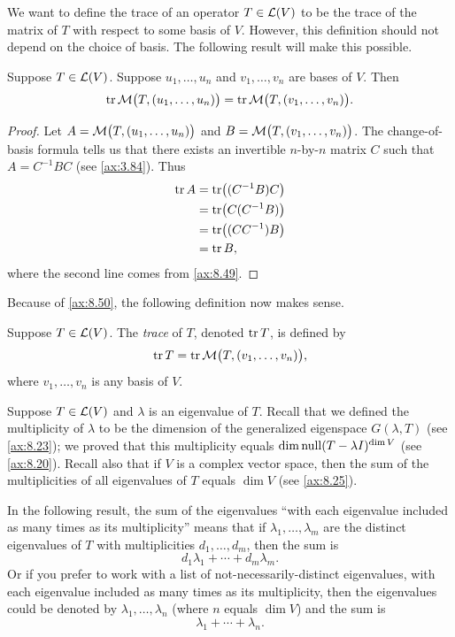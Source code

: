 We want to define the trace of an operator $T\in\mathcal{L}(V)$ to be the trace of the
matrix of $T$ with respect to some basis of $V$. However, this definition should
not depend on the choice of basis. The following result will make this
possible.

\begin{result}\label{ax:8.50}
Suppose $T\in\mathcal{L}(V)$. Suppose $u_1,\dots,u_n$ and $v_1,\dots,v_n$ are bases
of $V$. Then
\[ \operatorname{tr}\mathcal{M}\bigl(T,(u_1,\dots,u_n)\bigr) = \operatorname{tr}\mathcal{M}\bigl(T,(v_1,\dots,v_n)\bigr). \]
\end{result}

\begin{proof}
Let $A=\mathcal{M}\bigl(T,(u_1,\dots,u_n)\bigr)$ and
$B=\mathcal{M}\bigl(T,(v_1,\dots,v_n)\bigr)$. The change-of-basis formula tells us
that there exists an invertible $n$-by-$n$ matrix $C$ such that $A=C^{-1}BC$
(see \ref{ax:3.84}). Thus
\begin{align*}
\operatorname{tr} A &= \operatorname{tr}\bigl((C^{-1}B)C\bigr)\\
&= \operatorname{tr}\bigl(C(C^{-1}B)\bigr)\\
&= \operatorname{tr}\bigl((CC^{-1})B\bigr)\\
&= \operatorname{tr} B,
\end{align*}
where the second line comes from \ref{ax:8.49}.
\end{proof}

Because of \ref{ax:8.50}, the following definition now makes sense.

\begin{definition}\label{ax:8.51}
Suppose $T\in\mathcal{L}(V)$. The \emph{trace} of $T$, denoted $\operatorname{tr} T$, is defined by
\[ \operatorname{tr} T = \operatorname{tr}\mathcal{M}\bigl(T,(v_1,\dots,v_n)\bigr), \]
where $v_1,\dots,v_n$ is any basis of $V$.
\end{definition}

Suppose $T\in\mathcal{L}(V)$ and $\lambda$ is an eigenvalue of $T$. Recall that we
defined the multiplicity of $\lambda$ to be the dimension of the generalized
eigenspace $G(\lambda,T)$ (see \ref{ax:8.23}); we proved that this multiplicity
equals $\operatorname{dim}\operatorname{null}(T-\lambda I)^{\operatorname{dim} V}$ (see \ref{ax:8.20}). Recall also that
if $V$ is a complex vector space, then the sum of the multiplicities of all
eigenvalues of $T$ equals $\dim V$ (see \ref{ax:8.25}).

In the following result, the sum of the eigenvalues ``with each eigenvalue
included as many times as its multiplicity'' means that if
$\lambda_1,\dots,\lambda_m$ are the distinct eigenvalues of $T$ with
multiplicities $d_1,\dots,d_m$, then the sum is
\[ d_1\lambda_1+\cdots+d_m\lambda_m. \]
Or if you prefer to work with a list of not-necessarily-distinct eigenvalues,
with each eigenvalue included as many times as its multiplicity, then the
eigenvalues could be denoted by $\lambda_1,\dots,\lambda_n$ (where $n$ equals
$\dim V$) and the sum is
\[ \lambda_1+\cdots+\lambda_n. \]

